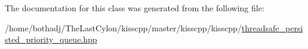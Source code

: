 The documentation for this class was generated from the following file\-:\begin{DoxyCompactItemize}
\item 
/home/bothadj/\-The\-Last\-Cylon/kisscpp/master/kisscpp/kisscpp/\hyperlink{threadsafe__persisted__priority__queue_8hpp}{threadsafe\-\_\-persisted\-\_\-priority\-\_\-queue.\-hpp}\end{DoxyCompactItemize}
